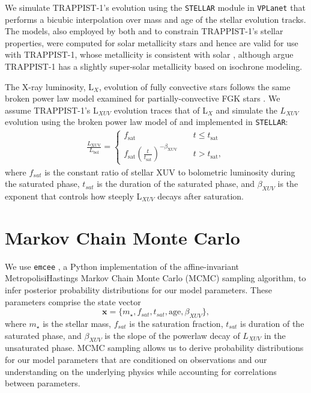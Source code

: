 \documentclass[twocolumn]{aastex62}
\newcommand{\vplanet}[0]{\texttt{VPLanet}\xspace}
\newcommand{\stellar}[0]{\texttt{STELLAR}\xspace}
\begin{document}
We simulate TRAPPIST-1's evolution using the \stellar module in \vplanet \citep{Barnes2016,vplanet2018} that performs a bicubic interpolation over mass and age of the \citet{Baraffe2015} stellar evolution tracks. The \citet{Baraffe2015} models, also employed by both \citet{Burgasser2017} and \citet{vanGrootel2018} to constrain TRAPPIST-1's stellar properties, were computed for solar metallicity stars and hence are valid for use with TRAPPIST-1, whose metallicity is consistent with solar \citep{Gillon2016}, although \citet{Burgasser2017} argue TRAPPIST-1 has a slightly super-solar metallicity based on isochrone modeling.

The X-ray luminosity, L$_{X}$, evolution of fully convective stars follows the same broken power law model examined for partially-convective FGK stars \citep{Wright2016,Wright2018}. We assume TRAPPIST-1's L$_{XUV}$ evolution traces that of L$_{X}$ and simulate the $L_{XUV}$ evolution using the broken power law model of \citet{Pizzolato2003} and \citet{Ribas2005} implemented in \stellar:
\begin{align}
\label{eqn:lxuv}
\frac{L_\mathrm{XUV}}{L_\mathrm{bol}} = \left\{
				\begin{array}{lcr}
					f_\mathrm{sat} &\ & t \leq t_\mathrm{sat} \\
					f_\mathrm{sat}\left(\frac{t}{t_\mathrm{sat}}\right)^{-\beta_\mathrm{XUV}} &\ & t > t_\mathrm{sat},
				\end{array}
				\right.
\end{align}
where $f_{sat}$ is the constant ratio of stellar XUV to bolometric luminosity during the saturated phase, $t_{sat}$ is the duration of the saturated phase, and $\beta_{XUV}$ is the exponent that controls how steeply L$_{XUV}$ decays after saturation.


\section{Markov Chain Monte Carlo} \label{sec:mcmc}

We use \texttt{emcee} \citep{ForemanMackey2013}, a Python implementation of the \citet{Goodman2010} affine-invariant MetropolisiHastings Markov Chain Monte Carlo (MCMC) sampling algorithm, to infer posterior probability distributions for our model parameters. These parameters comprise the state vector
\begin{equation}
    \textbf{x} = \{m_{\star}, f_{sat}, t_{sat}, \mathrm{age}, \beta_{XUV}\},
\end{equation}
where $m_{\star}$ is the stellar mass, $f_{sat}$ is the saturation fraction, $t_{sat}$ is duration of the saturated phase, and $\beta_{XUV}$ is the slope of the powerlaw decay of $L_{XUV}$ in the unsaturated phase.  MCMC sampling allows us to derive probability distributions for our model parameters that are conditioned on observations and our understanding on the underlying physics while accounting for correlations between parameters.  
\end{document}
